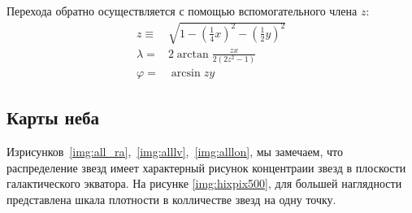 \documentclass[14pt]{article} %
\begin{document}
Перехода обратно осуществляется с помощью вспомогательного члена $z$:
\begin{equation*}
\begin{array}{lll}
z \equiv & \sqrt{1 - \left(\tfrac14 x\right)^2 - \left(\tfrac12 y\right)^2}\\
\lambda = & 2 \arctan \frac{zx}{2\left(2z^2 - 1\right)}\\
\varphi = & \arcsin {zy}
\end{array}
\end{equation*}

\subsection{Карты неба}\label{sub:smthrs}

Изрисунков~\ref{img:all_ra},~\ref{img:alllv},~\ref{img:alllon}, мы замечаем, что распределение звезд имеет характерный рисунок концентраии звезд в плоскости галактического экватора. На рисунке \ref{img:hixpix500}, для большей наглядности представлена шкала плотности в колличестве звезд на одну точку.
\end{document}
